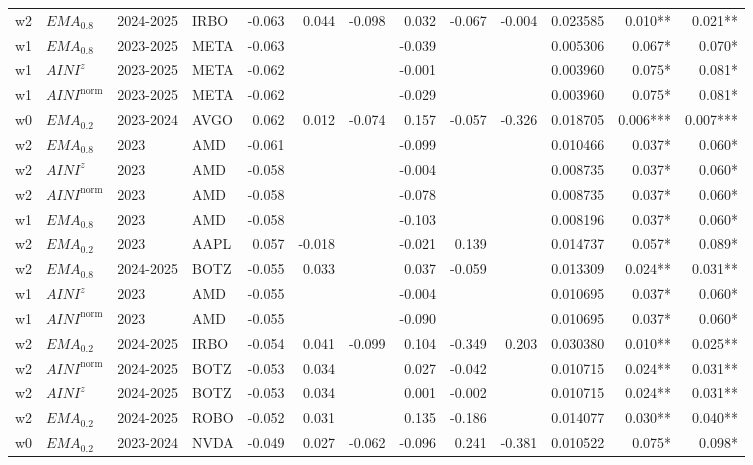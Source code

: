 \begin{longtable}{@{}llllrrrrrrrrr@{}}
w2 & $EMA_{0.8}$ & 2024-2025 & IRBO & -0.063 & 0.044 & -0.098 & 0.032 & -0.067 & -0.004 & 0.023585 & 0.010** & 0.021** \\
w1 & $EMA_{0.8}$ & 2023-2025 & META & -0.063 &  &  & -0.039 &  &  & 0.005306 & 0.067* & 0.070* \\
w1 & $AINI^{z}$ & 2023-2025 & META & -0.062 &  &  & -0.001 &  &  & 0.003960 & 0.075* & 0.081* \\
w1 & $AINI^{\mathrm{norm}}$ & 2023-2025 & META & -0.062 &  &  & -0.029 &  &  & 0.003960 & 0.075* & 0.081* \\
w0 & $EMA_{0.2}$ & 2023-2024 & AVGO & 0.062 & 0.012 & -0.074 & 0.157 & -0.057 & -0.326 & 0.018705 & 0.006*** & 0.007*** \\
w2 & $EMA_{0.8}$ & 2023 & AMD & -0.061 &  &  & -0.099 &  &  & 0.010466 & 0.037* & 0.060* \\
w2 & $AINI^{z}$ & 2023 & AMD & -0.058 &  &  & -0.004 &  &  & 0.008735 & 0.037* & 0.060* \\
w2 & $AINI^{\mathrm{norm}}$ & 2023 & AMD & -0.058 &  &  & -0.078 &  &  & 0.008735 & 0.037* & 0.060* \\
w1 & $EMA_{0.8}$ & 2023 & AMD & -0.058 &  &  & -0.103 &  &  & 0.008196 & 0.037* & 0.060* \\
w2 & $EMA_{0.2}$ & 2023 & AAPL & 0.057 & -0.018 &  & -0.021 & 0.139 &  & 0.014737 & 0.057* & 0.089* \\
w2 & $EMA_{0.8}$ & 2024-2025 & BOTZ & -0.055 & 0.033 &  & 0.037 & -0.059 &  & 0.013309 & 0.024** & 0.031** \\
w1 & $AINI^{z}$ & 2023 & AMD & -0.055 &  &  & -0.004 &  &  & 0.010695 & 0.037* & 0.060* \\
w1 & $AINI^{\mathrm{norm}}$ & 2023 & AMD & -0.055 &  &  & -0.090 &  &  & 0.010695 & 0.037* & 0.060* \\
w2 & $EMA_{0.2}$ & 2024-2025 & IRBO & -0.054 & 0.041 & -0.099 & 0.104 & -0.349 & 0.203 & 0.030380 & 0.010** & 0.025** \\
w2 & $AINI^{\mathrm{norm}}$ & 2024-2025 & BOTZ & -0.053 & 0.034 &  & 0.027 & -0.042 &  & 0.010715 & 0.024** & 0.031** \\
w2 & $AINI^{z}$ & 2024-2025 & BOTZ & -0.053 & 0.034 &  & 0.001 & -0.002 &  & 0.010715 & 0.024** & 0.031** \\
w2 & $EMA_{0.2}$ & 2024-2025 & ROBO & -0.052 & 0.031 &  & 0.135 & -0.186 &  & 0.014077 & 0.030** & 0.040** \\
w0 & $EMA_{0.2}$ & 2023-2024 & NVDA & -0.049 & 0.027 & -0.062 & -0.096 & 0.241 & -0.381 & 0.010522 & 0.075* & 0.098* \\

\end{longtable}
